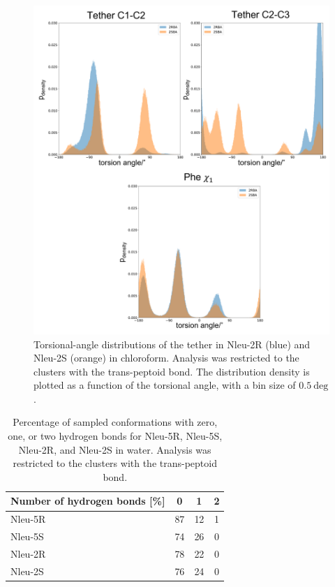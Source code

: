 \begin{figure}[h!]
    \centering
    \includegraphics[width=\textwidth]{7_chapter_5/fig/results/dihedral_dist_2RS.png}
    \caption{Torsional-angle distributions of the tether in Nleu-2R (blue) and Nleu-2S (orange) in chloroform. Analysis was restricted to the clusters with the trans-peptoid bond. The distribution density is plotted as a function of the torsional angle, with a bin size of $0.5~\text{deg}$.}
    \label{fig: SITorsion2RS}
\end{figure}


\FloatBarrier

\begin{table}[h!]
    \centering
    \caption{Percentage of sampled conformations with zero, one, or two hydrogen bonds for Nleu-5R, Nleu-5S, Nleu-2R, and Nleu-2S in water. Analysis was restricted to the clusters with the trans-peptoid bond.}
    \label{tab: hbondsratiowater}
    \begin{adjustbox}{max width=\textwidth}
    \begin{tabular}{lccc}
    Number of hydrogen bonds [\%] &	0 &	1 &	2 \\
    \hline
    Nleu-5R  &	87	& 12	& 1 \\
    Nleu-5S  &	74	& 26	& 0  \\
    Nleu-2R  &	78	& 22	& 0 \\
    Nleu-2S  &	76	& 24	& 0 \\
    \hline
    \end{tabular}
    \end{adjustbox}
\end{table}

